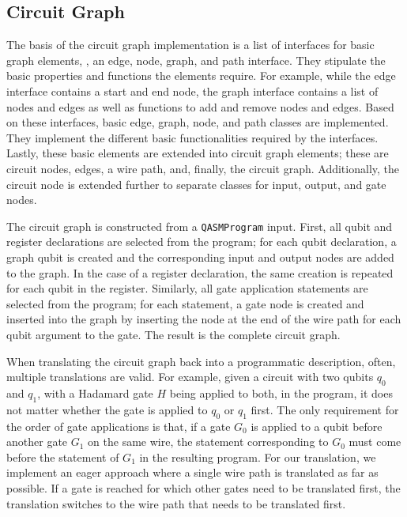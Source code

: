 \subsection{Circuit Graph}
The basis of the circuit graph implementation is a list of interfaces for basic graph elements, \ie, an edge, node, graph, and path interface. They stipulate the basic properties and functions the elements require. For example, while the edge interface contains a start and end node, the graph interface contains a list of nodes and edges as well as functions to add and remove nodes and edges. Based on these interfaces, basic edge, graph, node, and path classes are implemented. They implement the different basic functionalities required by the interfaces. Lastly, these basic elements are extended into circuit graph elements; these are circuit nodes, edges, a wire path, and, finally, the circuit graph. Additionally, the circuit node is extended further to separate classes for input, output, and gate nodes.

The circuit graph is constructed from a \texttt{QASMProgram} input. First, all qubit and register declarations are selected from the program; for each qubit declaration, a graph qubit is created and the corresponding input and output nodes are added to the graph. In the case of a register declaration, the same creation is repeated for each qubit in the register. Similarly, all gate application statements are selected from the program; for each statement, a gate node is created and inserted into the graph by inserting the node at the end of the wire path for each qubit argument to the gate. The result is the complete circuit graph. 

When translating the circuit graph back into a programmatic description, often, multiple translations are valid. For example, given a circuit with two qubits $q_0$ and $q_1$, with a Hadamard gate $H$ being applied to both, in the program, it does not matter whether the gate is applied to $q_0$ or $q_1$ first. The only requirement for the order of gate applications is that, if a gate $G_0$ is applied to a qubit before another gate $G_1$ on the same wire, the statement corresponding to $G_0$ must come before the statement of $G_1$ in the resulting program. For our translation, we implement an eager approach where a single wire path is translated as far as possible. If a gate is reached for which other gates need to be translated first, the translation switches to the wire path that needs to be translated first. 

